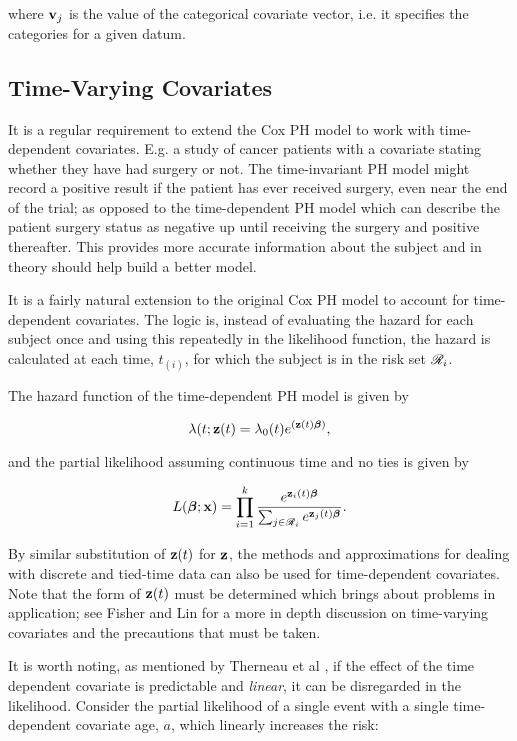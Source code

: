 where $\textbf{v}_j$ is the value of the categorical covariate vector, i.e. it specifies the categories for a given datum.

\subsection{Time-Varying Covariates}

It is a regular requirement to extend the Cox PH model to work with time-dependent covariates. E.g. a study of cancer patients with a covariate stating whether they have had surgery or not. The time-invariant PH model might record a positive result if the patient has ever received surgery, even near the end of the trial; as opposed to the time-dependent PH model which can describe the patient surgery status as negative up until receiving the surgery and positive thereafter. This provides more accurate information about the subject and in theory should help build a better model.

It is a fairly natural extension to the original Cox PH model to account for time-dependent covariates. The logic is, instead of evaluating the hazard for each subject once and using this repeatedly in the likelihood function, the hazard is calculated at each time, $t_{(i)}$, for which the subject is in the risk set $\mathscr{R}_i$.

The hazard function of the time-dependent PH model is given by

\begin{equation}
    \lambda(t;\textbf{z}(t)=\lambda_0(t)e^{(\textbf{z}(t)\boldsymbol{\beta})},
\end{equation}

and the partial likelihood assuming continuous time and no ties is given by

\begin{equation}
    L(\boldsymbol{\beta};\textbf{x}) = \prod_{i=1}^k\frac{e^{\textbf{z}_i(t)\boldsymbol{\beta}}}{\sum_{j\in\mathscr{R}_i}e^{\textbf{z}_j(t)\boldsymbol{\beta}}}.
\end{equation}

By similar substitution of $\textbf{z}(t)$ for $\textbf{z}$, the methods and approximations for dealing with discrete and tied-time data can also be used for time-dependent covariates. Note that the form of $\textbf{z}(t)$ must be determined which brings about problems in application; see Fisher and Lin  for a more in depth discussion on time-varying covariates and the precautions that must be taken.

It is worth noting, as mentioned by Therneau et al , if the effect of the time dependent covariate is predictable and \emph{linear}, it can be disregarded in the likelihood. Consider the partial likelihood of a single event with a single time-dependent covariate age, $a$, which linearly increases the risk:

